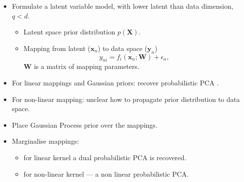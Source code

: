 \documentclass[english,color,smalltitle]{manchesterposter}
\begin{document}
\begin{multicols}{5}{\LARGE \par}
\begin{columnbox}
\-


\begin{itemize}
\item Formulate a latent variable model, with lower latent than data dimension,
$q<d$. {\large \par}

\begin{itemize}
\item Latent space prior distribution $p\left(\mathbf{X}\right)$. {\large \par}
\item Mapping from latent ($\mathbf{x}_{n}$) to data space ($\mathbf{y}_{n}$)\[
y_{ni}=f_{i}\left(\mathbf{x}_{n};\mathbf{W}\right)+\epsilon_{n},\]
$\mathbf{W}$ is a matrix of mapping parameters. {\large \par}
\end{itemize}
\item For linear mappings and Gaussian priors: recover probabilistic PCA
\citep{Tipping:probpca99}.{\large \par}
\item For non-linear mapping: unclear how to propagate prior distribution
to data space.{\large \par}
\end{itemize}
\end{columnbox}


\begin{columnbox}
\-


\begin{itemize}
\item Place Gaussian Process prior over the mappings.{\large \par}
\item Marginalise mappings: {\large \par}

\begin{itemize}
\item for linear kernel a dual probabilistic PCA is recovered.{\large \par}
\item for non-linear kernel --- a non linear probabilistic PCA.{\large \par}
\end{itemize}
\end{itemize}
\end{columnbox}



\end{multicols}
\end{document}
